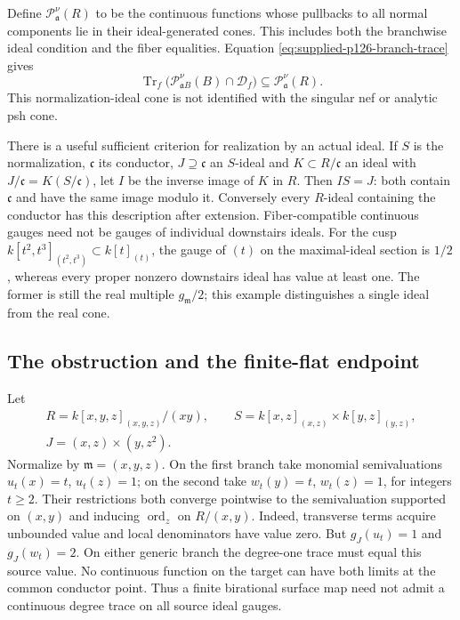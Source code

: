 Define $\mathcal P_{\mathfrak a}^{\nu}(R)$ to be the continuous functions
whose pullbacks to all normal components lie in their ideal-generated
cones. This includes both the branchwise ideal condition and the fiber
equalities. Equation \eqref{eq:supplied-p126-branch-trace} gives
\[
 \operatorname{Tr}_f\bigl(\mathcal P_{\mathfrak aB}^{\nu}(B)
                         \cap\mathcal D_f\bigr)
                  \subseteq\mathcal P_{\mathfrak a}^{\nu}(R).
\]
This normalization-ideal cone is not identified with the singular nef
or analytic psh cone.

There is a useful sufficient criterion for realization by an actual
ideal. If $S$ is the normalization, $\mathfrak c$ its conductor,
$J\supseteq\mathfrak c$ an $S$-ideal and $K\subset R/\mathfrak c$ an
ideal with $J/\mathfrak c=K(S/\mathfrak c)$, let $I$ be the inverse
image of $K$ in $R$. Then $IS=J$: both contain $\mathfrak c$ and have
the same image modulo it. Conversely every $R$-ideal containing the
conductor has this description after extension. Fiber-compatible
continuous gauges need not be gauges of individual downstairs ideals.
For the cusp $k[t^2,t^3]_{(t^2,t^3)}\subset k[t]_{(t)}$, the gauge of
$(t)$ on the maximal-ideal section is $1/2$, whereas every proper
nonzero downstairs ideal has value at least one. The former is still
the real multiple $g_{\mathfrak m}/2$; this example distinguishes a
single ideal from the real cone.

\subsection{The obstruction and the finite-flat endpoint}

\begin{example}\label{ex:supplied-p126-conductor-obstruction}
Let
\[
 \begin{gathered}
 R=k[x,y,z]_{(x,y,z)}/(xy),\qquad
 S=k[x,z]_{(x,z)}\times k[y,z]_{(y,z)},\\
 J=(x,z)\times(y,z^2).
 \end{gathered}
\]
Normalize by $\mathfrak m=(x,y,z)$. On the first branch take monomial
semivaluations $u_t(x)=t$, $u_t(z)=1$; on the second take
$w_t(y)=t$, $w_t(z)=1$, for integers $t\geq2$. Their restrictions both
converge pointwise to the semivaluation supported on $(x,y)$ and inducing
$\operatorname{ord}_z$ on $R/(x,y)$. Indeed, transverse terms acquire
unbounded value and local denominators have value zero. But
$g_J(u_t)=1$ and $g_J(w_t)=2$. On either generic branch the degree-one
trace must equal this source value. No continuous function on the target
can have both limits at the common conductor point. Thus a finite
birational surface map need not admit a continuous degree trace on all
source ideal gauges.
\end{example}

